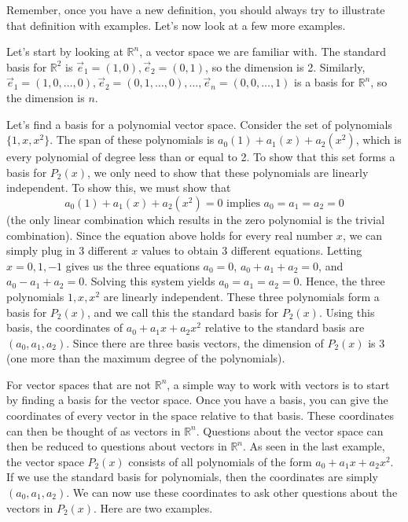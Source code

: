 Remember, once you have a new definition, you should always try to illustrate that definition with examples.  Let's now look at a few more examples. 
\begin{example} Let's start by looking at $\mathbb{R}^n$, a vector space we are familiar with.
The standard basis for ${\mathbb{R}}^2$ is $\vec e_1 = (1,0),\vec e_2=(0,1)$, so the dimension is 2. 
Similarly,  $\vec e_1 = (1,0,\ldots,0),\vec e_2=(0,1,\ldots,0), \ldots, \vec e_n=(0,0,\ldots,1)$ is a basis for ${\mathbb{R}}^n$, so the dimension is $n$.  
\end{example}

\begin{example}
Let's find a basis for a polynomial vector space. 
Consider the set of polynomials $\{1, x, x^2\}$. The span of these polynomials is $a_0(1)+a_1(x)+a_2(x^2)$, which is every polynomial of degree less than or equal to 2. 
To show that this set forms a basis for $P_2(x)$, we only need to show that these polynomials are linearly independent.  
To show this, we must show that $$a_0(1)+a_1(x)+a_2(x^2) = 0 \text{ implies } a_0=a_1=a_2=0$$ (the only linear combination which results in the zero polynomial is the trivial combination).  
Since the equation above holds for every real number $x$, we can simply plug in 3 different $x$ values to obtain 3 different equations. Letting $x=0,1,-1$ gives us the three equations $a_0=0$, $a_0+a_1+a_2=0$, and $a_0-a_1+a_2=0$. Solving this system yields $a_0=a_1=a_2=0$. Hence, the three polynomials $1, x, x^2$ are linearly independent.  
These three polynomials form a basis for $P_2(x)$, and we call this the standard basis for $P_2(x)$.  Using this basis, the coordinates of $a_0+a_1x+a_2x^2$ relative to the standard basis are $(a_0,a_1,a_2)$.
Since there are three basis vectors, the dimension of $P_2(x)$ is 3 (one more than the maximum degree of the polynomials). 
%
\end{example}


For vector spaces that are not ${\mathbb{R}}^n$, a simple way to work with vectors is to start by finding a basis for the vector space. Once you have a basis, you can give the coordinates of every vector in the space relative to that basis.  These coordinates can then be thought of as vectors in ${\mathbb{R}}^n$. Questions about the vector space can then be reduced to questions about vectors in $\mathbb{R}^n$.  As seen in the last example, the vector space $P_2(x)$ consists of all polynomials of the form $a_0+a_1x+a_2x^2$. If we use the standard basis for polynomials, then the coordinates are simply $(a_0,a_1,a_2)$. We can now use these coordinates to ask other questions about the vectors in $P_2(x)$. Here are two examples.

